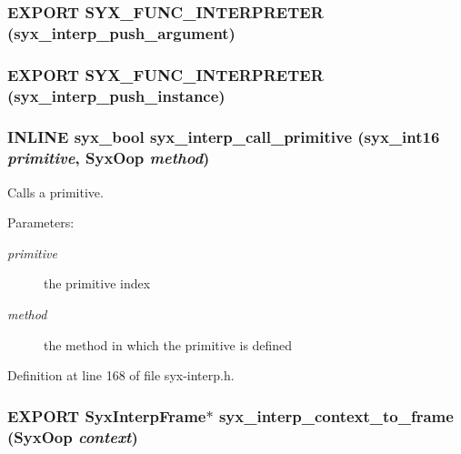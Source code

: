 \hypertarget{syx-interp_8h_b3211faac2a5031ccc2cf7377e9e0588}{
\subsubsection{\setlength{\rightskip}{0pt plus 5cm}EXPORT SYX\_\-FUNC\_\-INTERPRETER (syx\_\-interp\_\-push\_\-argument)}}
\label{syx-interp_8h_b3211faac2a5031ccc2cf7377e9e0588}


\hypertarget{syx-interp_8h_54820f46e37cdbc55742dbe9280161a3}{
\subsubsection{\setlength{\rightskip}{0pt plus 5cm}EXPORT SYX\_\-FUNC\_\-INTERPRETER (syx\_\-interp\_\-push\_\-instance)}}
\label{syx-interp_8h_54820f46e37cdbc55742dbe9280161a3}


\hypertarget{syx-interp_8h_91229ee5f9766714c7bdfb51cfb34258}{
\subsubsection{\setlength{\rightskip}{0pt plus 5cm}INLINE {\bf syx\_\-bool} syx\_\-interp\_\-call\_\-primitive ({\bf syx\_\-int16} {\em primitive}, \/  {\bf SyxOop} {\em method})}}
\label{syx-interp_8h_91229ee5f9766714c7bdfb51cfb34258}


Calls a primitive.

\begin{Desc}
\item[Parameters:]
\begin{description}
\item[{\em primitive}]the primitive index \item[{\em method}]the method in which the primitive is defined \end{description}
\end{Desc}


Definition at line 168 of file syx-interp.h.\hypertarget{syx-interp_8h_5dffc11604b4760e555186fb26cce54c}{
\subsubsection{\setlength{\rightskip}{0pt plus 5cm}EXPORT {\bf SyxInterpFrame}$\ast$ syx\_\-interp\_\-context\_\-to\_\-frame ({\bf SyxOop} {\em context})}}
\label{syx-interp_8h_5dffc11604b4760e555186fb26cce54c}


